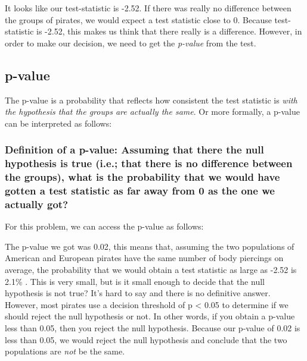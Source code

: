 \documentclass[]{book}
\newenvironment{Shaded}{\begin{snugshade}}{\end{snugshade}}
\newcommand{\CommentTok}[1]{\textcolor[rgb]{0.56,0.35,0.01}{\textit{#1}}}
\newcommand{\OperatorTok}[1]{\textcolor[rgb]{0.81,0.36,0.00}{\textbf{#1}}}
\newcommand{\NormalTok}[1]{#1}
\theoremstyle{definition}
\theoremstyle{definition}
\theoremstyle{remark}
\begin{document}
It looks like our test-statistic is -2.52. If there was really no
difference between the groups of pirates, we would expect a test
statistic close to 0. Because test-statistic is -2.52, this makes us
think that there really is a difference. However, in order to make our
decision, we need to get the \emph{p-value} from the test.

\subsection{p-value}\label{p-value}

The p-value is a probability that reflects how consistent the test
statistic is \emph{with the hypothesis that the groups are actually the
same}. Or more formally, a p-value can be interpreted as follows:

\subsubsection{Definition of a p-value: Assuming that there the null
hypothesis is true (i.e.; that there is no difference between the
groups), what is the probability that we would have gotten a test
statistic as far away from 0 as the one we actually
got?}\label{definition-of-a-p-value-assuming-that-there-the-null-hypothesis-is-true-i.e.-that-there-is-no-difference-between-the-groups-what-is-the-probability-that-we-would-have-gotten-a-test-statistic-as-far-away-from-0-as-the-one-we-actually-got}

For this problem, we can access the p-value as follows:

\begin{Shaded}
\end{Shaded}

The p-value we got was 0.02, this means that, assuming the two
populations of American and European pirates have the same number of
body piercings on average, the probability that we would obtain a test
statistic as large as -2.52 is 2.1\% . This is very small, but is it
small enough to decide that the null hypothesis is not true? It's hard
to say and there is no definitive answer. However, most pirates use a
decision threshold of p \textless{} 0.05 to determine if we should
reject the null hypothesis or not. In other words, if you obtain a
p-value less than 0.05, then you reject the null hypothesis. Because our
p-value of 0.02 is less than 0.05, we would reject the null hypothesis
and conclude that the two populations are \emph{not} be the same.
\end{document}
